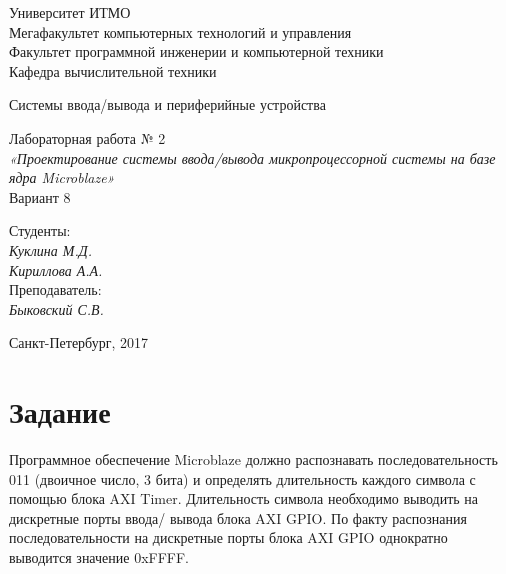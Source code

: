 \documentclass[12pt, a4paper] {ncc}
\begin{document}
\setcounter{figure}{0}
\frenchspacing
\pagestyle{empty}
\begin{center}
                            Университет ИТМО    \\
					Мегафакультет компьютерных технологий и управления \\ 
					Факультет программной инженерии и компьютерной техники \\
                        Кафедра вычислительной техники

                Системы ввода/вывода и периферийные устройства
\end{center}
\begin{center}
				Лабораторная работа № 2 \\
			{\it «Проектирование системы ввода/вывода микропроцессорной системы
				  на базе ядра Microblaze»}\\
					Вариант 8
\end{center}
\begin{flushright}
                                    Студенты:\\
                                    {\it Куклина М.Д.}\\
                                    {\it Кириллова А.А.}\\
                                    Преподаватель: \\
                                    {\it Быковский С.В.}
\end{flushright}
\begin{center}
                             Санкт-Петербург, 2017
\end{center}
\newpage


\section{Задание}

Программное обеспечение Microblaze должно распознавать последовательность 
011 (двоичное число, 3 бита) и определять длительность каждого символа с 
помощью блока AXI Timer. Длительность символа необходимо выводить на 
дискретные порты ввода/ вывода блока AXI GPIO. По факту распознания 
последовательности на дискретные порты блока AXI GPIO однократно выводится 
значение 0xFFFF. 
\end{document}
